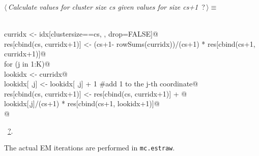 \documentclass[reqno]{amsart}
\renewcommand{\NWtarget}[2]{\hypertarget{#1}{#2}}
\renewcommand{\NWlink}[2]{\hyperlink{#1}{#2}}
\begin{document}
\begin{flushleft} \small
\begin{minipage}{\linewidth}\label{scrap26}\raggedright\small
\NWtarget{nuweb?}{} $\langle\,${\itshape Calculate values for cluster size cs given values for size cs+1}\nobreak\ {\footnotesize {?}}$\,\rangle\equiv$
\vspace{-1ex}
\begin{list}{}{} \item
\mbox{}\verb@@\\
\mbox{}\verb@  curridx <- idx[clustersize==cs, , drop=FALSE]@\\
\mbox{}\verb@  res[cbind(cs, curridx+1)] <- (cs+1- rowSums(curridx))/(cs+1) * res[cbind(cs+1, curridx+1)]@\\
\mbox{}\verb@  for (j in 1:K){@\\
\mbox{}\verb@    lookidx <- curridx@\\
\mbox{}\verb@    lookidx[ ,j] <- lookidx[ ,j] + 1   #add 1 to the j-th coordinate@\\
\mbox{}\verb@    res[cbind(cs, curridx+1)] <- res[cbind(cs, curridx+1)] + @\\
\mbox{}\verb@                                 lookidx[,j]/(cs+1) * res[cbind(cs+1, lookidx+1)]@\\
\mbox{}\verb@  }  @\\
\mbox{}\verb@@{\NWsep}
\end{list}
\vspace{-1.5ex}
\footnotesize
\begin{list}{}{\setlength{\itemsep}{-\parsep}\setlength{\itemindent}{-\leftmargin}}
\item \NWtxtMacroRefIn\ \NWlink{nuweb?}{?}.

\item{}
\end{list}
\end{minipage}\vspace{4ex}
\end{flushleft}
The actual EM iterations are performed in \texttt{mc.estraw}. 
\end{document}
